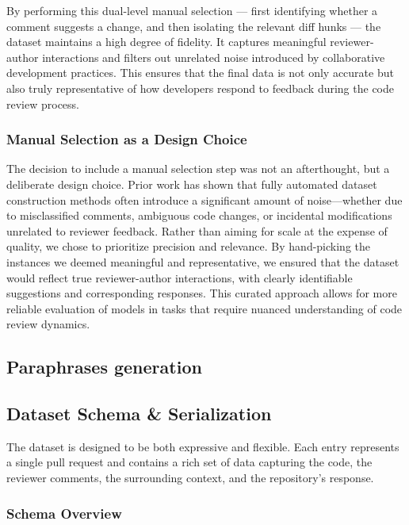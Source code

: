 By performing this dual-level manual selection — first identifying whether a comment suggests a
change, and then isolating the relevant diff hunks — the dataset maintains a high degree of
fidelity. It captures meaningful reviewer-author interactions and filters out unrelated noise
introduced by collaborative development practices. This ensures that the final data is not only
accurate but also truly representative of how developers respond to feedback during the code review
process.

\subsubsection{Manual Selection as a Design Choice}

The decision to include a manual selection step was not an afterthought, but a deliberate design
choice. Prior work has shown that fully automated dataset construction methods often introduce a
significant amount of noise—whether due to misclassified comments, ambiguous code changes, or
incidental modifications unrelated to reviewer feedback. Rather than aiming for scale at the expense
of quality, we chose to prioritize precision and relevance. By hand-picking the instances we deemed
meaningful and representative, we ensured that the dataset would reflect true reviewer-author
interactions, with clearly identifiable suggestions and corresponding responses. This curated
approach allows for more reliable evaluation of models in tasks that require nuanced understanding
of code review dynamics.

\subsection{Paraphrases generation}
\label{sec:paraphrases}

\subsection{Dataset Schema \& Serialization}

The dataset is designed to be both expressive and flexible. Each entry represents a single pull
request and contains a rich set of data capturing the code, the reviewer comments, the surrounding
context, and the repository’s response.

\subsubsection{Schema Overview}

